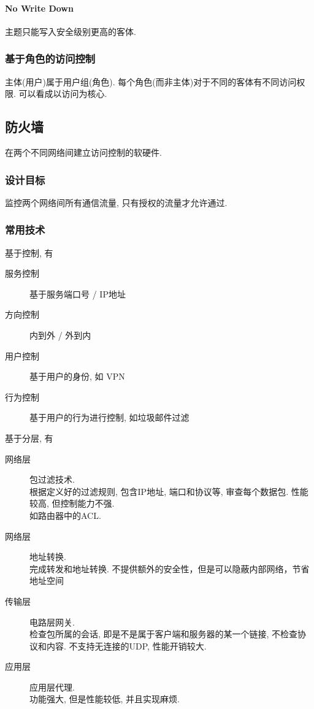\documentclass{ctexart}
\begin{document}
\paragraph{No Write Down}
    主题只能写入安全级别更高的客体.
\subsubsection{基于角色的访问控制}
    主体(用户)属于用户组(角色). 每个角色(而非主体)对于不同的客体有不同访问权限.
    可以看成以访问为核心.

\subsection{防火墙}
    在两个不同网络间建立访问控制的软硬件.
\subsubsection{设计目标}
    监控两个网络间所有通信流量, 只有授权的流量才允许通过.
\subsubsection{常用技术} 基于控制, 有\begin{description}
        \item[服务控制] 基于服务端口号 / IP地址
        \item[方向控制] 内到外 / 外到内
        \item[用户控制] 基于用户的身份, 如 VPN
        \item[行为控制] 基于用户的行为进行控制, 如垃圾邮件过滤
    \end{description}基于分层, 有\begin{description}
        \item[网络层] 包过滤技术.\\
            根据定义好的过滤规则, 包含IP地址, 端口和协议等, 审查每个数据包. 性能较高, 但控制能力不强.\\
            如路由器中的ACL.
        \item[网络层] 地址转换.\\
            完成转发和地址转换. 不提供额外的安全性，但是可以隐蔽内部网络，节省地址空间\\
        \item[传输层] 电路层网关.\\
            检查包所属的会话, 即是不是属于客户端和服务器的某一个链接, 不检查协议和内容.
            不支持无连接的UDP, 性能开销较大.
        \item[应用层] 应用层代理.\\
            功能强大, 但是性能较低, 并且实现麻烦.
    \end{description}
\end{document}
